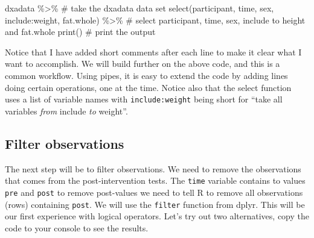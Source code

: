 \documentclass[
  11pt,
  letterpaper,
]{scrbook}
\newenvironment{Shaded}{\begin{snugshade}}{\end{snugshade}}
\newcommand{\CommentTok}[1]{\textcolor[rgb]{0.37,0.37,0.37}{#1}}
\newcommand{\FunctionTok}[1]{\textcolor[rgb]{0.28,0.35,0.67}{#1}}
\newcommand{\NormalTok}[1]{\textcolor[rgb]{0.00,0.23,0.31}{#1}}
\newcommand{\SpecialCharTok}[1]{\textcolor[rgb]{0.37,0.37,0.37}{#1}}
\begin{document}
\begin{Shaded}
\begin{Highlighting}[numbers=left,,]
\NormalTok{dxadata }\SpecialCharTok{\%\textgreater{}\%} \CommentTok{\# take the dxadata data set}
  \FunctionTok{select}\NormalTok{(participant, time, sex, include}\SpecialCharTok{:}\NormalTok{weight, fat.whole) }\SpecialCharTok{\%\textgreater{}\%} 
  \CommentTok{\# select participant, time, sex, include to height and fat.whole}
  \FunctionTok{print}\NormalTok{() }\CommentTok{\# print the output}
\end{Highlighting}
\end{Shaded}

Notice that I have added short comments after each line to make it clear
what I want to accomplish. We will build further on the above code, and
this is a common workflow. Using pipes, it is easy to extend the code by
adding lines doing certain operations, one at the time. Notice also that
the select function uses a list of variable names with
\texttt{include:weight} being short for ``take all variables \emph{from}
include \emph{to} weight''.

\hypertarget{filter-observations}{%
\subsection{Filter observations}\label{filter-observations}}

The next step will be to filter observations. We need to remove the
observations that comes from the post-intervention tests. The
\texttt{time} variable contains to values \texttt{pre} and \texttt{post}
to remove post-values we need to tell R to remove all observations
(rows) containing \texttt{post}. We will use the \texttt{filter}
function from dplyr. This will be our first experience with logical
operators. Let's try out two alternatives, copy the code to your console
to see the results.
\end{document}
